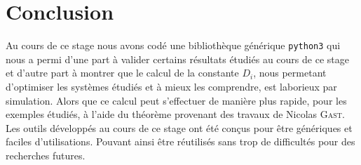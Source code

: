 \documentclass[a4paper,12pt]{report}
\def\D{\displaystyle}
\begin{document}
\chapter*{Conclusion}

Au cours de ce stage nous avons codé une bibliothèque générique
\texttt{python3} qui nous a permi d'une part à valider certains
résultats étudiés au cours de ce stage et d'autre part à montrer que
le calcul de la constante  $\D D_i$, nous permetant d'optimiser les
systèmes étudiés et à mieux les comprendre, est laborieux par
simulation. Alors que ce calcul peut s'effectuer de manière plus
rapide, pour les exemples étudiés, à l'aide du théorème provenant des
travaux de Nicolas \textsc{Gast}.
Les outils développés au cours de ce stage ont été conçus pour être
génériques et faciles d'utilisations. Pouvant ainsi être réutilisés
sans trop de difficultés pour des recherches futures.



\appendix
\end{document}
